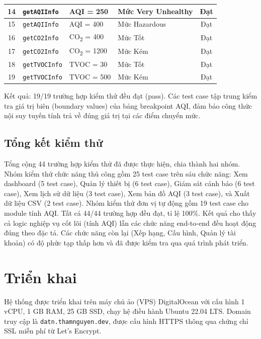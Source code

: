 \documentclass[../DoAn.tex]{subfiles}
\begin{document}
\begin{table}[H]
\begin{tabularx}{\textwidth}{|c|X|X|X|c|}
\hline
14 & \texttt{getAQIInfo} & AQI = 250 & Mức Very Unhealthy & Đạt \\
\hline
15 & \texttt{getAQIInfo} & AQI = 400 & Mức Hazardous & Đạt \\
\hline
16 & \texttt{getCO2Info} & CO\textsubscript{2} = 400 & Mức Tốt & Đạt \\
\hline
17 & \texttt{getCO2Info} & CO\textsubscript{2} = 1200 & Mức Kém & Đạt \\
\hline
18 & \texttt{getTVOCInfo} & TVOC = 30 & Mức Tốt & Đạt \\
\hline
19 & \texttt{getTVOCInfo} & TVOC = 500 & Mức Kém & Đạt \\
\hline
\end{tabularx}
\end{table}

Kết quả: 19/19 trường hợp kiểm thử đều đạt (pass). Các test case tập trung kiểm tra giá trị biên (boundary values) của bảng breakpoint AQI, đảm bảo công thức nội suy tuyến tính trả về đúng giá trị tại các điểm chuyển mức.

\subsection{Tổng kết kiểm thử}
\label{subsection:4.4.8}

Tổng cộng 44 trường hợp kiểm thử đã được thực hiện, chia thành hai nhóm. Nhóm kiểm thử chức năng thủ công gồm 25 test case trên sáu chức năng: Xem dashboard (5 test case), Quản lý thiết bị (6 test case), Giám sát cảnh báo (6 test case), Xem lịch sử dữ liệu (3 test case), Xem bản đồ AQI (3 test case), và Xuất dữ liệu CSV (2 test case). Nhóm kiểm thử đơn vị tự động gồm 19 test case cho module tính AQI. Tất cả 44/44 trường hợp đều đạt, tỉ lệ 100\%. Kết quả cho thấy cả logic nghiệp vụ cốt lõi (tính AQI) lẫn các chức năng end-to-end đều hoạt động đúng theo đặc tả. Các chức năng còn lại (Xếp hạng, Cấu hình, Quản lý tài khoản) có độ phức tạp thấp hơn và đã được kiểm tra qua quá trình phát triển.

\section{Triển khai}
\label{section:4.5}

Hệ thống được triển khai trên máy chủ ảo (VPS) DigitalOcean với cấu hình 1 vCPU, 1 GB RAM, 25 GB SSD, chạy hệ điều hành Ubuntu 22.04 LTS. Domain truy cập là \texttt{datn.thamnguyen.dev}, được cấu hình HTTPS thông qua chứng chỉ SSL miễn phí từ Let's Encrypt.
\end{document}
